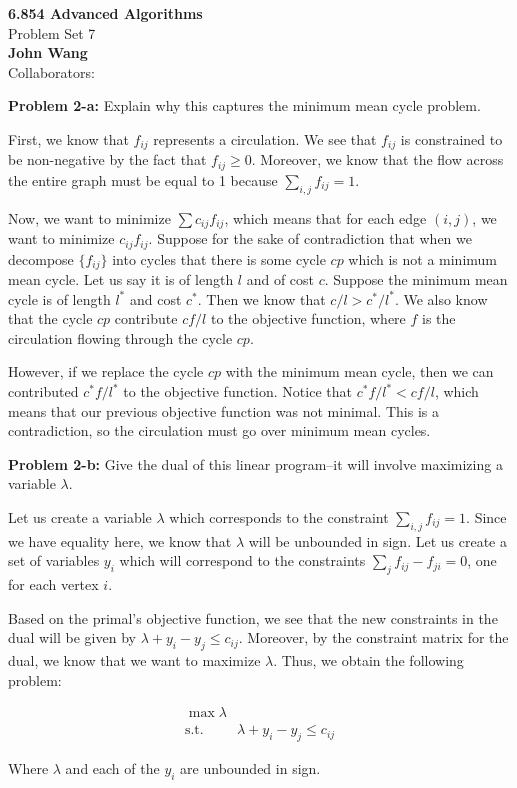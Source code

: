 \documentclass[psamsfonts]{amsart}
\newenvironment{sol}{\vspace{0.25cm}{\large \bfseries Solution:}}{\qedsymbol}
\newenvironment{prob}[1]{\begin{framed}{\large \bfseries Problem #1:}}{\end{framed}}
\newcommand{\makenewtitle}{
    \begin{center}
    {\huge \bfseries 6.854 Advanced Algorithms} \\
    Problem Set 7\\
    \vspace{0.25cm}
    {\bfseries John Wang} \\
    Collaborators: 
    \end{center}
    \vspace{0.5cm}
}
\begin{document}
\newpage
\makenewtitle

\begin{prob}{2-a}
Explain why this captures the minimum mean cycle problem.
\end{prob}
\begin{sol}
First, we know that $f_{ij}$ represents a circulation. We see that $f_{ij}$ is constrained to be non-negative by the fact that $f_{ij} \geq 0$. Moreover, we know that the flow across the entire graph must be equal to 1 because $\sum_{i,j} f_{ij} = 1$. 

Now, we want to minimize $\sum c_{ij} f_{ij}$, which means that for each edge $(i,j)$, we want to minimize $c_{ij} f_{ij}$. Suppose for the sake of contradiction that when we decompose $\{ f_{ij} \}$ into cycles that there is some cycle $cp$ which is not a minimum mean cycle. Let us say it is of length $l$ and of cost $c$. Suppose the minimum mean cycle is of length $l^*$ and cost $c^*$. Then we know that $c/l > c^*/l^*$. We also know that the cycle $cp$ contribute $c f / l$ to the objective function, where $f$ is the circulation flowing through the cycle $cp$. 

However, if we replace the cycle $cp$ with the minimum mean cycle, then we can contributed $c^* f / l^*$ to the objective function. Notice that $c^* f / l^* < c f/l $, which means that our previous objective function was not minimal. This is a contradiction, so the circulation must go over minimum mean cycles.  
\end{sol}

\begin{prob}{2-b}
Give the dual of this linear program--it will involve maximizing a variable $\lambda$.
\end{prob}
\begin{sol}
Let us create a variable $\lambda$ which corresponds to the constraint $\sum_{i,j} f_{ij} = 1$. Since we have equality here, we know that $\lambda$ will be unbounded in sign. Let us create a set of variables $y_{i}$ which will correspond to the constraints $\sum_{j} f_{ij} - f_{ji} = 0$, one for each vertex $i$. 

Based on the primal's objective function, we see that the new constraints in the dual will be given by $\lambda + y_i - y_j \leq c_{ij}$. Moreover, by the constraint matrix for the dual, we know that we want to maximize $\lambda$. Thus, we obtain the following problem:

\begin{eqnarray}
\max \lambda \\
\text{s.t.} \hspace{1cm} \lambda + y_i - y_j \leq c_{ij}
\end{eqnarray}

Where $\lambda$ and each of the $y_i$ are unbounded in sign.
\end{sol}
\end{document}
